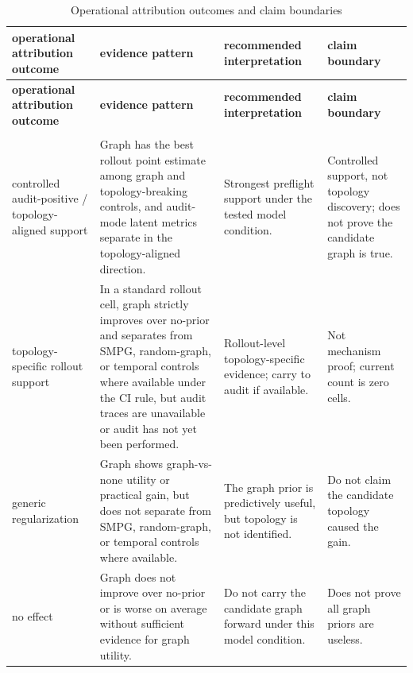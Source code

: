 \documentclass[preprint,12pt]{elsarticle}
\begin{document}
\begingroup
\footnotesize
\setlength{\tabcolsep}{3pt}
\renewcommand{\arraystretch}{1.08}
\begin{longtable}{>{\raggedright\arraybackslash}p{}>{\raggedright\arraybackslash}p{}>{\raggedright\arraybackslash}p{}>{\raggedright\arraybackslash}p{}}
\caption{Operational attribution outcomes and claim boundaries}\label{tab:attribution-classes}\label{tab:protocol-labels}\\
\toprule
\textbf{operational attribution outcome} & \textbf{evidence pattern} & \textbf{recommended interpretation} & \textbf{claim boundary} \\
\midrule
\endfirsthead
\toprule
\textbf{operational attribution outcome} & \textbf{evidence pattern} & \textbf{recommended interpretation} & \textbf{claim boundary} \\
\midrule
\endhead
\midrule
\multicolumn{4}{r}{\emph{Continued on next page}} \\
\midrule
\endfoot
\bottomrule
\endlastfoot
controlled audit-positive / topology-aligned support & Graph has the best rollout point estimate among graph and topology-breaking controls, and audit-mode latent metrics separate in the topology-aligned direction. & Strongest preflight support under the tested model condition. & Controlled support, not topology discovery; does not prove the candidate graph is true. \\
topology-specific rollout support & In a standard rollout cell, graph strictly improves over no-prior and separates from SMPG, random-graph, or temporal controls where available under the CI rule, but audit traces are unavailable or audit has not yet been performed. & Rollout-level topology-specific evidence; carry to audit if available. & Not mechanism proof; current count is zero cells. \\
generic regularization & Graph shows graph-vs-none utility or practical gain, but does not separate from SMPG, random-graph, or temporal controls where available. & The graph prior is predictively useful, but topology is not identified. & Do not claim the candidate topology caused the gain. \\
no effect & Graph does not improve over no-prior or is worse on average without sufficient evidence for graph utility. & Do not carry the candidate graph forward under this model condition. & Does not prove all graph priors are useless. \\
\end{longtable}
\endgroup
\end{document}
